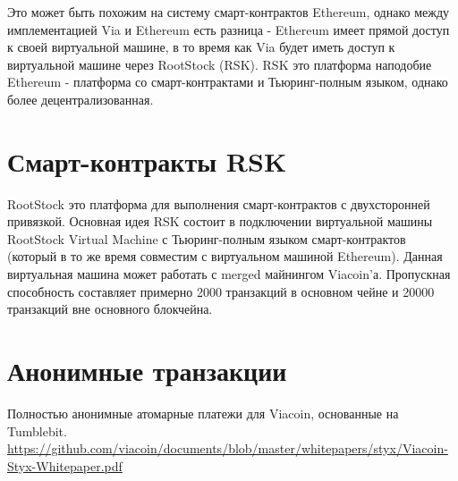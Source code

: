 \documentclass{article}
\begin{document}
\noindent
Это может быть похожим на систему смарт-контрактов Ethereum, однако между имплементацией Via и Ethereum есть разница - Ethereum имеет прямой доступ к своей виртуальной машине, в то время как Via будет иметь доступ к виртуальной машине через RootStock (RSK). RSK это платформа наподобие Ethereum - платформа со смарт-контрактами и Тьюринг-полным языком, однако более децентрализованная.

\section{Смарт-контракты RSK} \label{Viacoin RSK smart contracts}
\cite{rootstock}RootStock это платформа для выполнения смарт-контрактов с двухсторонней привязкой. Основная идея RSK состоит в подключении виртуальной машины RootStock Virtual Machine с Тьюринг-полным языком смарт-контрактов (который в то же время совместим с виртуальном машиной Ethereum). Данная виртуальная машина может работать с merged майнингом Viacoin'а. Пропускная способность составляет примерно 2000 транзакций в основном чейне и 20000 транзакций вне основного блокчейна.

\section{Анонимные транзакции} \label{Anonymous transactions}
\cite{styx}Полностью анонимные атомарные платежи для Viacoin, основанные на Tumblebit. \newline
\url{https://github.com/viacoin/documents/blob/master/whitepapers/styx/Viacoin-Styx-Whitepaper.pdf}
\newpage
\printbibliography
\end{document}
